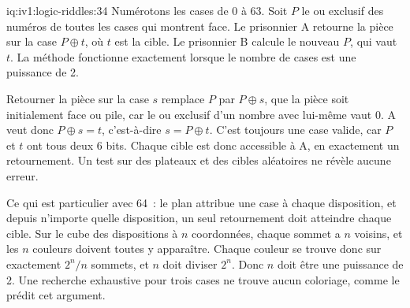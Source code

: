 \begin{solution}{iq:iv1:logic-riddles:34}
Numérotons les cases de 0 à 63. Soit $P$ le ou exclusif des numéros de toutes les cases qui montrent face. Le prisonnier A retourne la pièce sur la case $P \oplus t$, où $t$ est la cible. Le prisonnier B calcule le nouveau $P$, qui vaut $t$. La méthode fonctionne exactement lorsque le nombre de cases est une puissance de 2.

Retourner la pièce sur la case $s$ remplace $P$ par $P \oplus s$, que la pièce soit initialement face ou pile, car le ou exclusif d'un nombre avec lui-même vaut 0. A veut donc $P \oplus s = t$, c'est-à-dire $s = P \oplus t$. C'est toujours une case valide, car $P$ et $t$ ont tous deux 6 bits. Chaque cible est donc accessible à A, en exactement un retournement. Un test sur des plateaux et des cibles aléatoires ne révèle aucune erreur.

Ce qui est particulier avec 64~: le plan attribue une case à chaque disposition, et depuis n'importe quelle disposition, un seul retournement doit atteindre chaque cible. Sur le cube des dispositions à $n$ coordonnées, chaque sommet a $n$ voisins, et les $n$ couleurs doivent toutes y apparaître. Chaque couleur se trouve donc sur exactement $2^n/n$ sommets, et $n$ doit diviser $2^n$. Donc $n$ doit être une puissance de 2. Une recherche exhaustive pour trois cases ne trouve aucun coloriage, comme le prédit cet argument.

\end{solution}

